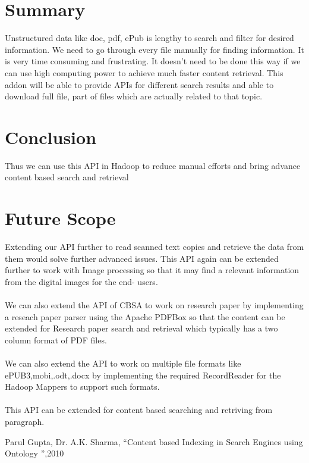 \documentclass[oneside,a4paper,12pt]{report}
\begin{document}
{\section{Summary}
Unstructured data like doc, pdf, ePub is lengthy to search and filter for desired information. We need to go through every file manually for finding information. It is very time consuming and frustrating. It doesn’t need to be done this way if we can use high computing power to achieve much faster content retrieval. This addon will be able to provide APIs for different search results and able to download full file, part of files which are actually related to that topic. 

\section{Conclusion}
Thus we can use this API in Hadoop to reduce manual efforts and bring advance content based search and retrieval

\section{Future Scope}
Extending our API further to read scanned text copies and retrieve the data from them would solve further advanced issues. This API again can be extended further to work with Image processing so that it may find a relevant information from the digital images for the end- users.\\\\
We can also extend the API of CBSA to work on research paper by implementing a reseach paper parser using the Apache PDFBox so that the content can be extended for Research paper search and retrieval which typically has a two column format of PDF files.\\\\
We can also extend the API to work on multiple file formats like ePUB3,mobi,.odt,.docx by implementing the required RecordReader for the Hadoop Mappers to support such formats.\\\\
This API can be extended for content based searching and retriving from paragraph.


\begin{appendices}

\begin{thebibliography}{7}

 Parul Gupta, Dr. A.K. Sharma, “Content based Indexing in Search Engines using Ontology ”,2010


\end{thebibliography}
\end{appendices}}
\end{document}
